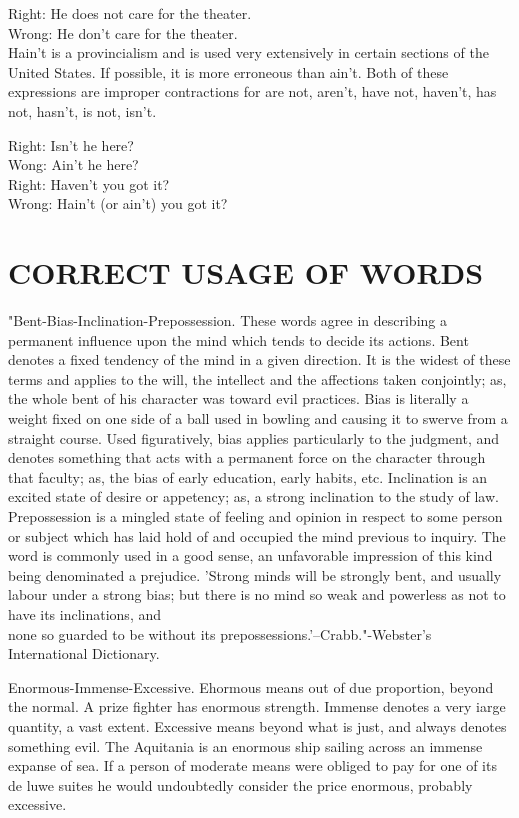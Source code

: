 \documentclass[10pt]{article}
\begin{document}
Right: He does not care for the theater.\\
Wrong: He don't care for the theater.\\
Hain't is a provincialism and is used very extensively in certain sections of the United States. If possible, it is more erroneous than ain't. Both of these expressions are improper contractions for are not, aren't, have not, haven't, has not, hasn't, is not, isn't.

Right: Isn't he here?\\
Wong: Ain't he here?\\
Right: Haven't you got it?\\
Wrong: Hain't (or ain't) you got it?

\section*{CORRECT USAGE OF WORDS}
"Bent-Bias-Inclination-Prepossession. These words agree in describing a permanent influence upon the mind which tends to decide its actions. Bent denotes a fixed tendency of the mind in a given direction. It is the widest of these terms and applies to the will, the intellect and the affections taken conjointly; as, the whole bent of his character was toward evil practices. Bias is literally a weight fixed on one side of a ball used in bowling and causing it to swerve from a straight course. Used figuratively, bias applies particularly to the judgment, and denotes something that acts with a permanent force on the character through that faculty; as, the bias of early education, early habits, etc. Inclination is an excited state of desire or appetency; as, a strong inclination to the study of law. Prepossession is a mingled state of feeling and opinion in respect to some person or subject which has laid hold of and occupied the mind previous to inquiry. The word is commonly used in a good sense, an unfavorable impression of this kind being denominated a prejudice. 'Strong minds will be strongly bent, and usually labour under a strong bias; but there is no mind so weak and powerless as not to have its inclinations, and\\
none so guarded to be without its prepossessions.'--Crabb."-Webster's International Dictionary.

Enormous-Immense-Excessive. Ehormous means out of due proportion, beyond the normal. A prize fighter has enormous strength. Immense denotes a very iarge quantity, a vast extent. Excessive means beyond what is just, and always denotes something evil. The Aquitania is an enormous ship sailing across an immense expanse of sea. If a person of moderate means were obliged to pay for one of its de luwe suites he would undoubtedly consider the price enormous, probably excessive.
\end{document}
